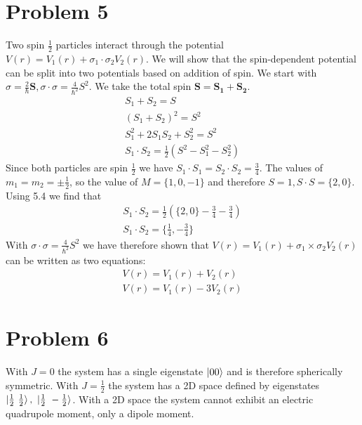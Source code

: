 \documentclass[a4paper,12pt]{article}
\numberwithin{equation}{section}
\newcommand{\bv}[1]{\mathbf{#1}}
\begin{document}
\section{Problem 5}
Two spin $\frac{1}{2}$ particles interact through the potential $V(r)=V_1(r)+\sigma_1\cdot \sigma_2V_2(r)$.
We will show that the spin-dependent potential can be split into two potentials based on addition of spin.
We start with $\sigma=\frac{2}{\hbar}\bv{S}, \sigma \cdot\sigma=\frac{4}{\hbar^2}S^2$. We take the total spin $\bv{S}=\bv{S_1}+\bv{S_2}$.
\begin{gather}
 S_1+S_2=S\\
 (S_1+S_2)^2=S^2\\
 S_1^2+2S_1S_2+S_2^2=S^2\\
 S_1 \cdot S_2 = \frac{1}{2}\left (S^2-S_1^2-S_2^2 \right )
\end{gather}
Since both particles are spin $\frac{1}{2}$ we have $S_1 \cdot S_1=S_2 \cdot S_2=\frac{3}{4}$.
The values of $m_1=m_2=\pm \frac{1}{2}$, so the value of $M=\{1,0,-1\}$ and therefore $S=1, S \cdot S = \{2,0\}$.
Using 5.4 we find that 
\begin{gather}
S_1 \cdot S_2=\frac{1}{2}\left( \{2, 0\} - \frac{3}{4}-\frac{3}{4} \right)\\
S_1 \cdot S_2=\{\frac{1}{4}, -\frac{3}{4}\}
\end{gather}
With $\sigma \cdot\sigma=\frac{4}{\hbar^2}S^2$ we have therefore shown that $V(r)=V_1(r)+\sigma_1\times \sigma_2V_2(r)$
can be written as two equations:
\begin{gather}
 V(r)=V_1(r)+V_2(r)\\
 V(r)=V_1(r)-3V_2(r)
\end{gather}

\section{Problem 6}
With $J=0$ the system has a single eigenstate $\ket{0 0}$ and is therefore spherically symmetric.
With $J=\frac{1}{2}$ the system has a 2D space defined by eigenstates $\ket{\frac{1}{2}\ \frac{1}{2}},\ \ket{\frac{1}{2}\ -\frac{1}{2}}$.
With a 2D space the system cannot exhibit an electric quadrupole moment, only a dipole moment.
\end{document}
